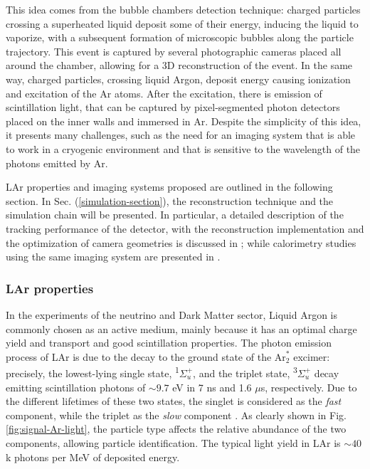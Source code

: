 This idea comes from the bubble chambers detection technique: charged particles crossing a superheated liquid deposit some of their energy, inducing the liquid to vaporize, with a subsequent formation of microscopic bubbles along the particle trajectory. This event is captured by several photographic cameras placed all around the chamber, allowing for a 3D reconstruction of the event. In the same way, charged particles, crossing  liquid Argon, deposit energy causing ionization and excitation of the Ar atoms. After the excitation, there is emission of scintillation light, that can be captured by pixel-segmented photon detectors placed on the inner walls and immersed in Ar. Despite the simplicity of this idea, it presents many challenges, such as the need for an imaging system that is able to work in a cryogenic environment and that is sensitive to the wavelength of the photons emitted by Ar. 

LAr properties and imaging systems proposed are outlined in the following section. In Sec. (\ref{simulation-section}), the reconstruction technique and the simulation chain will be presented. In particular, a detailed description of the tracking performance of the detector, with the reconstruction implementation and the optimization of camera geometries is discussed in \cite{tesi-cicero}; while calorimetry studies using the same imaging system are presented in \cite{tesi-pia}.

\subsubsection{LAr properties}
\label{LAr-prop}
In the experiments of the neutrino and Dark Matter sector, Liquid Argon is commonly chosen as an active medium, mainly because it has an optimal charge yield and transport and good scintillation properties. The photon emission process of LAr is due to the decay to the ground state of the $\text{Ar}^*_2$ excimer: precisely, the lowest-lying single state, \textsuperscript{1}$\Sigma^+_u$, and the triplet state, \textsuperscript{3}$\Sigma^+_u$ decay emitting scintillation photons of $\sim 9.7$ eV in 7 ns and 1.6 $\mu$s, respectively. Due to the different lifetimes of these two states, the singlet is considered as the \textit{fast} component, while the triplet as the \textit{slow} component \cite{LAr-theory}. As clearly shown in Fig. \ref{fig:signal-Ar-light}, the particle type affects the relative abundance of the two components, allowing particle identification. The typical light yield in LAr is $\sim 40$k photons per MeV of deposited energy. 

